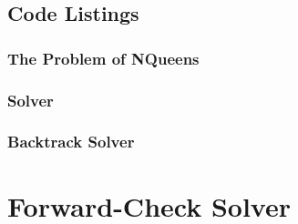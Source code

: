 \documentclass{article}
\begin{document}
\subsection*{Code Listings}
\subsubsection*{The Problem of NQueens}
%

\subsubsection*{Solver}
%
%
\subsubsection*{Backtrack Solver}
%

\section*{Forward-Check Solver}
\end{document}
